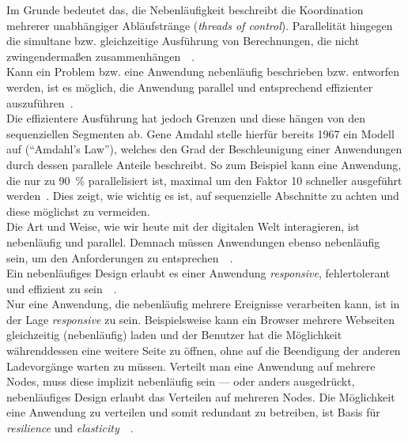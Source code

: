 Im Grunde bedeutet das, die Nebenläufigkeit beschreibt die Koordination mehrerer unabhängiger Abläufstränge (\textit{threads of control}). Parallelität hingegen die simultane bzw. gleichzeitige Ausführung von Berechnungen, die nicht zwingendermaßen zusammenhängen~\cite[S.~8-9]{pike_concurrency_2012}~\cite[S.~3]{butcher_seven_2014}.\\
Kann ein Problem bzw. eine Anwendung nebenläufig beschrieben bzw. entworfen werden, ist es möglich, die Anwendung parallel und entsprechend effizienter auszuführen~\cite[S.~19~\&~S.~30]{pike_concurrency_2012}.\\
Die effizientere Ausführung hat jedoch Grenzen und diese hängen von den sequenziellen Segmenten ab. Gene Amdahl stelle hierfür bereits 1967 ein Modell auf (\enquote{Amdahl's Law}), welches den Grad der Beschleunigung einer Anwendungen durch dessen parallele Anteile beschreibt. So zum Beispiel kann eine Anwendung, die nur zu 90~\% parallelisiert ist, maximal um den Faktor 10 schneller ausgeführt werden~\cite{amdahl_validity_1967}. Dies zeigt, wie wichtig es ist, auf sequenzielle Abschnitte zu achten und diese möglichst zu vermeiden.\\

Die Art und Weise, wie wir heute mit der digitalen Welt interagieren, ist nebenläufig und parallel. Demnach müssen Anwendungen ebenso nebenläufig sein, um den Anforderungen zu entsprechen~\cite[S.~5]{butcher_seven_2014}~\cite[S.~3~\&~S.~178]{armstrong_programming_2013}.\\
Ein nebenläufiges Design erlaubt es einer Anwendung \textit{responsive}, fehlertolerant und effizient zu sein~\cite[S.~4~\&~S.~6]{butcher_seven_2014}~\cite[S.~6]{armstrong_programming_2013}.\\
Nur eine Anwendung, die nebenläufig mehrere Ereignisse verarbeiten kann, ist in der Lage \textit{responsive} zu sein. Beispielsweise kann ein Browser mehrere Webseiten gleichzeitig (nebenläufig) laden und der Benutzer hat die Möglichkeit währenddessen eine weitere Seite zu öffnen, ohne auf die Beendigung der anderen Ladevorgänge warten zu müssen. Verteilt man eine Anwendung auf mehrere Nodes, muss diese implizit nebenläufig sein --- oder anders ausgedrückt, nebenläufiges Design erlaubt das Verteilen auf mehreren Nodes. Die Möglichkeit eine Anwendung zu verteilen und somit redundant zu betreiben, ist Basis für \textit{resilience} und \textit{elasticity}~\cite[S.~6]{butcher_seven_2014}~\cite[S.~6~\&~S.~7]{armstrong_programming_2013}.\\

